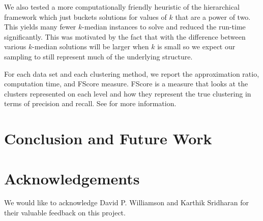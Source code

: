 \documentclass{article}
\begin{document}
We also tested a more computationally friendly heuristic of the hierarchical framework which just buckets solutions for values of $k$ that are a power of two. This yields many fewer $k$-median instances to solve and reduced the run-time significantly. This was motivated by the fact that with the difference between various $k$-median solutions will be larger when $k$ is small so we expect our sampling to still represent much of the underlying structure. 
 
For each data set and each clustering method, we report the approximation ratio, computation time, and FScore measure.  FScore is a measure that looks at the clusters represented on each level and how they represent the true clustering in terms of precision and recall. See \cite{Larsen} for more information. 


\section{Conclusion and Future Work}

\section{Acknowledgements}
We would like to acknowledge David P. Williamson and Karthik Sridharan for their valuable feedback on this project.

\label{submission}




\end{document}
